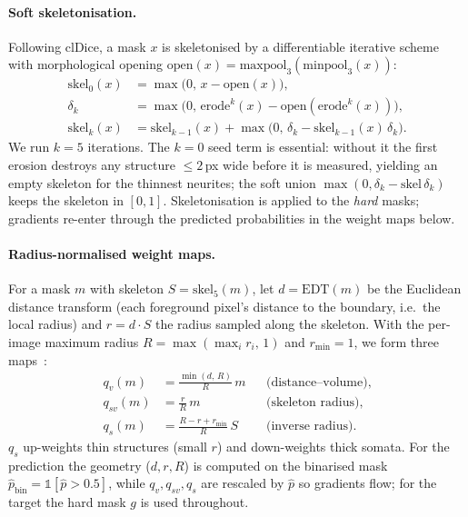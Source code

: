 \documentclass[11pt,a4paper]{article}
\begin{document}
\paragraph{Soft skeletonisation.} Following clDice, a mask $x$ is
skeletonised by a differentiable iterative scheme with morphological
opening $\mathrm{open}(x) = \mathrm{maxpool}_{3}(\mathrm{minpool}_{3}(x))$:
\begin{align}
    \mathrm{skel}_0(x) &= \max\bigl(0,\, x - \mathrm{open}(x)\bigr), \\
    \delta_k &= \max\bigl(0,\, \mathrm{erode}^k(x) - \mathrm{open}(\mathrm{erode}^k(x))\bigr), \\
    \mathrm{skel}_k(x) &= \mathrm{skel}_{k-1}(x) + \max\bigl(0,\,
        \delta_k - \mathrm{skel}_{k-1}(x)\,\delta_k\bigr).
\end{align}
We run $k=5$ iterations. The $k{=}0$ seed term is essential: without it
the first erosion destroys any structure $\le 2$\,px wide before it is
measured, yielding an empty skeleton for the thinnest neurites; the
soft union $\max(0, \delta_k - \mathrm{skel}\,\delta_k)$ keeps the
skeleton in $[0,1]$. Skeletonisation is applied to the \emph{hard}
masks; gradients re-enter through the predicted probabilities in the
weight maps below.

\paragraph{Radius-normalised weight maps.} For a mask $m$ with skeleton
$S = \mathrm{skel}_5(m)$, let $d = \mathrm{EDT}(m)$ be the Euclidean
distance transform (each foreground pixel's distance to the boundary,
i.e.\ the local radius) and $r = d \cdot S$ the radius sampled along the
skeleton. With the per-image maximum radius $R = \max(\max_i r_i,\, 1)$
and $r_{\min}=1$, we form three maps~\cite{cbdice}:
\begin{align}
    q_v(m) &= \tfrac{\min(d,\,R)}{R}\, m && \text{(distance--volume)}, \\
    q_{sv}(m) &= \tfrac{r}{R}\, m && \text{(skeleton radius)}, \\
    q_s(m) &= \tfrac{R - r + r_{\min}}{R}\, S && \text{(inverse radius)}.
\end{align}
$q_s$ up-weights thin structures (small $r$) and down-weights thick
somata. For the prediction the geometry ($d, r, R$) is computed on the
binarised mask $\hat p_\text{bin} = \mathbb{1}[\hat p > 0.5]$, while
$q_v, q_{sv}, q_s$ are rescaled by $\hat p$ so gradients flow; for the
target the hard mask $g$ is used throughout.
\end{document}
